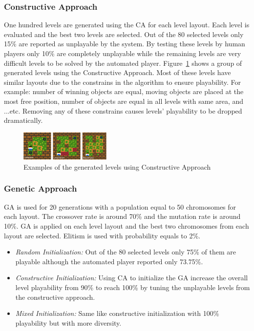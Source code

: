 \documentclass[letterpaper]{article}
\newcommand{\figref}[1]{Figure~\ref{Figure:#1}}
\begin{document}
\subsubsection{Constructive Approach}
One hundred levels are generated using the CA for each level layout. Each level is evaluated and the best two levels are selected. Out of the 80 selected levels only 15\% are reported as unplayable by the system. By testing these levels by human players only 10\% are completely unplayable while the remaining levels are very difficult levels to be solved by the automated player. \figref{constructiveExamples} shows a group of generated levels using the Constructive Approach. Most of these levels have similar layouts due to the constrains in the algorithm to ensure playability. For example: number of winning objects are equal, moving objects are placed at the most free position, number of objects are equal in all levels with same area, and ...etc. Removing any of these constrains causes levels' playability to be dropped dramatically.

\begin{figure}[ht]
  	\centering
    \includegraphics[width=0.4\textwidth]{Images/constructiveExamples}
    \caption{Examples of the generated levels using Constructive Approach}
    \label{Figure:constructiveExamples}
\end{figure}

\subsubsection{Genetic Approach}
GA is used for 20 generations with a population equal to 50 chromosomes for each layout. The crossover rate is around 70\% and the mutation rate is around 10\%. GA is applied on each level layout and the best two chromosomes from each layout are selected. Elitism is used with probability equals to 2\%.
\begin{itemize}
	\item \emph{Random Initialization:} Out of the 80 selected levels only 75\% of them are playable although the automated player reported only 73.75\%.
	\item \emph{Constructive Initialization:} Using CA to initialize the GA increase the overall level playability from 90\% to reach 100\% by tuning the unplayable levels from the constructive approach.
	\item \emph{Mixed Initialization:} Same like constructive initialization with 100\% playability but with more diversity.
\end{itemize}
\end{document}
